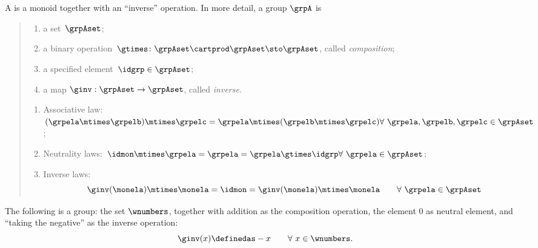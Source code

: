 

\section{}\label{sec:groups}


\begin{ctdefinition}[Group]
  \label{def:group}
  A \emph{} is a monoid together with an ``inverse'' operation.
  In more detail, a group $\grpA$ is
  \begin{quote}
    \constit
    \begin{enumerate}
      \item a set~$\grpAset$;
      \item a binary operation~$\gtimes \colon \grpAset \cartprod \grpAset \sto \grpAset$, called \emph{composition};
      \item a specified element~$\idgrp \in \grpAset$;
      \item a map $\ginv: \grpAset \to \grpAset$, called \emph{inverse}.
    \end{enumerate}
    \condit
    \begin{enumerate}
      \item Associative law:~$(\grpela\mtimes \grpelb)\mtimes \grpelc=\grpela\mtimes (\grpelb\mtimes \grpelc) \hfill \forall \  \grpela, \grpelb, \grpelc \in \grpAset$;
      \item Neutrality laws:~$\idmon\mtimes \grpela=\grpela=\grpela \gtimes \idgrp \hfill \forall \  \grpela \in \grpAset$;
      \item Inverse laws:
      \begin{equation}\label{eq:group-inverse-law}
        \ginv(\monela) \mtimes \monela = \idmon = \ginv(\monela) \mtimes \monela \quad \quad \forall \  \grpela  \in \grpAset
      \end{equation}
    \end{enumerate}
  \end{quote}
\end{ctdefinition}

\begin{example}
The following is a group: the set $\wnumbers$, together with addition as the composition operation, the element $0$ as neutral element, and ``taking the negative'' as the inverse operation: 
\begin{equation}
\ginv(x) \definedas -x \quad \quad \forall \ x \in \wnumbers.
\end{equation}
\end{example}

